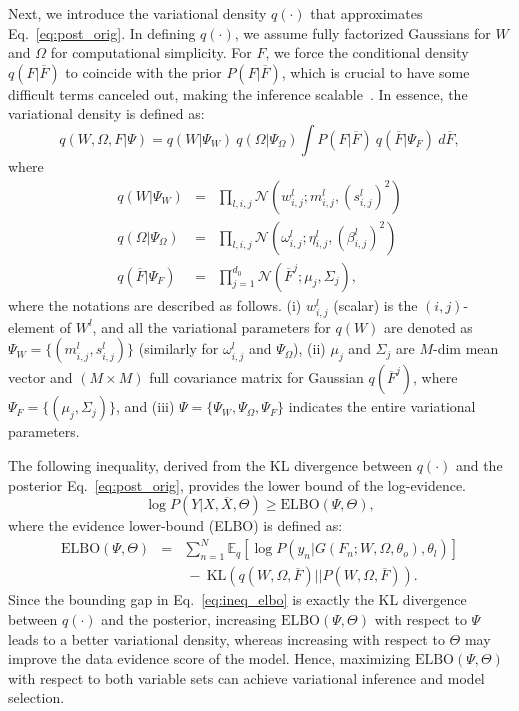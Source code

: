 \documentclass[conference]{IEEEtran}
\begin{document}
Next, we introduce the variational density $q(\cdot)$ that approximates 
Eq.~\ref{eq:post_orig}. In defining $q(\cdot)$, we assume fully factorized Gaussians 
for $W$ and $\Omega$ for computational simplicity. 
For $F$, we force the conditional density $q(F|\overline{F})$ to coincide with 
the prior $P(F|\overline{F})$, which is crucial to have some difficult terms 
canceled out, making the inference scalable~\cite{titsias09}. In essence, the 
variational density is defined as:
\begin{equation}
q(W, \Omega, F| \Psi) = q(W| \Psi_W) \ q(\Omega| \Psi_\Omega)  
    \int P(F|\overline{F}) \ q(\overline{F}| \Psi_F) \ d\overline{F},
\label{eq:inf_q}
\end{equation}
where 
\begin{eqnarray}
q(W| \Psi_W) &=&    \label{eq:inf_qW}
    \prod_{l,i,j} \mathcal{N}(w^l_{i,j}; m^l_{i,j}, (s^l_{i,j})^2) \\ 
q(\Omega| \Psi_\Omega) &=&    \label{eq:inf_qOmega}
    \prod_{l,i,j} \mathcal{N}(\omega^l_{i,j}; \eta^l_{i,j}, (\beta^l_{i,j})^2) \\
q(\overline{F}| \Psi_F) &=&    \label{eq:inf_qF}
    \prod_{j=1}^{d_0} \mathcal{N}(\overline{F}^j; \mu_j, \Sigma_j),
\label{eq:inf_q_each}
\end{eqnarray}
where the notations are described as follows.
(i) $w^l_{i,j}$ (scalar) is  the $(i,j)$-element of $W^l$, and all the variational 
parameters for $q(W)$ are denoted as $\Psi_W=\{ (m^l_{i,j},s^l_{i,j}) \}$ 
(similarly for $\omega^l_{i,j}$ and $\Psi_\Omega$), 
(ii) $\mu_j$ and $\Sigma_j$ are $M$-dim mean vector and $(M \times M)$ full 
covariance matrix for Gaussian $q(\overline{F}^j)$, 
where $\Psi_F = \{ (\mu_j, \Sigma_j) \}$, and 
(iii) $\Psi=\{\Psi_W, \Psi_\Omega, \Psi_F\}$ indicates the entire variational 
parameters. 

The following inequality, derived from the KL divergence between $q(\cdot)$ 
and the posterior Eq.~\ref{eq:post_orig}, provides the lower bound of the 
log-evidence.
\begin{equation}
\log P(Y| X, \overline{X}, \Theta) \geq \textrm{ELBO}(\Psi, \Theta),
\label{eq:ineq_elbo}
\end{equation}
where the evidence lower-bound (ELBO) is defined as:
\begin{eqnarray}
\textrm{ELBO}(\Psi, \Theta) &=&  %
\sum_{n=1}^N \mathbb{E}_q [ \log P(y_n|G(F_n; W, \Omega, \theta_o), \theta_l)]  \nonumber \\ 
&& \ - \ %
  \textrm{KL}(q(W,\Omega,\overline{F})||P(W,\Omega,\overline{F})).  %
\label{eq:elbo}
\end{eqnarray}
Since the bounding gap in Eq.~\ref{eq:ineq_elbo} is exactly the KL divergence 
between $q(\cdot)$ and the posterior, increasing $\textrm{ELBO}(\Psi, \Theta)$ 
with respect to $\Psi$ leads to a better variational density, 
whereas increasing with respect to $\Theta$ may improve the data evidence score of the model. Hence, maximizing $\textrm{ELBO}(\Psi, \Theta)$ with respect to both variable sets
can achieve variational inference and  model selection. 
\end{document}
